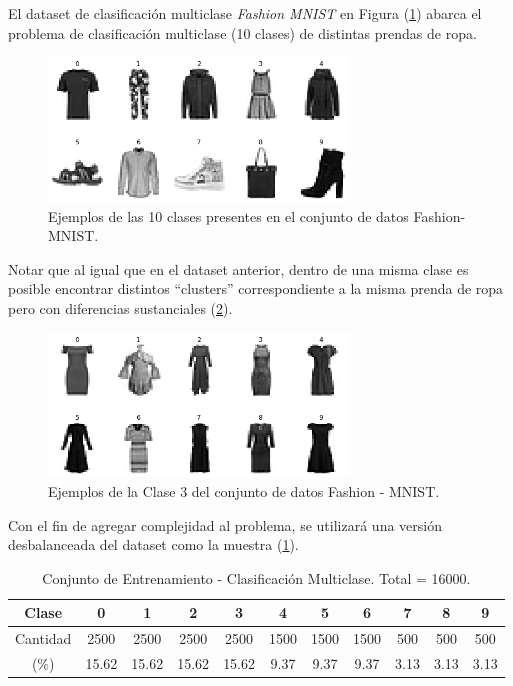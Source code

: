 El dataset de clasificación multiclase \textit{Fashion MNIST} en Figura (\ref{fig:fashion_mnist}) abarca el problema de clasificación multiclase (10 clases) de distintas prendas de ropa. 

\begin{figure}[ht]
    \centering
    \includegraphics[width=8cm]{img/tesis/fashion_mnist.png}
    \caption{Ejemplos de las 10 clases presentes en el conjunto de datos Fashion-MNIST.}
    \label{fig:fashion_mnist}
\end{figure}

\vspace{0.2cm}

Notar que al igual que en el dataset anterior, dentro de una misma clase es posible encontrar distintos ``clusters'' correspondiente a la misma prenda de ropa pero con diferencias sustanciales (\ref{fig:fashion_mnist_label_3}).

\vspace{0.2CM}

\begin{figure}[ht]
    \centering
    \includegraphics[width=8cm]{img/tesis/fashion_mnist_label_3.png}
    \caption{Ejemplos de la Clase 3 del conjunto de datos Fashion - MNIST.}
    \label{fig:fashion_mnist_label_3}
\end{figure}

Con el fin de agregar complejidad al problema, se utilizará una versión desbalanceada del dataset como la muestra (\ref{table:fashion_mnist}).

\begin{table}[ht]
\begin{tabular}{|c|c|c|c|c|c|c|c|c|c|c|}
\hline
Clase    & 0    & 1    & 2    & 3    & 4    & 5    & 6   & 7   & 8   & 9   \\ \hline
Cantidad & 2500 & 2500 & 2500 & 2500 & 1500 & 1500 & 1500 & 500 & 500 & 500 \\ \hline
(\%) & 15.62 & 15.62 & 15.62 & 15.62 & 9.37 & 9.37 & 9.37 & 3.13 & 3.13 & 3.13 \\ \hline
\end{tabular}
\caption{Conjunto de Entrenamiento - Clasificación Multiclase. Total = 16000.}
\label{table:fashion_mnist}
\end{table}

